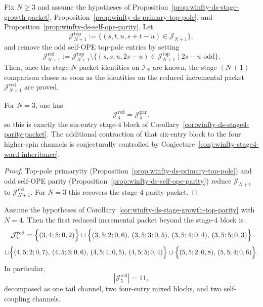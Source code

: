 \begin{corollary}
\label{cor:winfty-ds-stage-growth-top-parity}
Fix $N \ge 3$ and assume the hypotheses of
Proposition~\ref{prop:winfty-ds-stage-growth-packet},
Proposition~\ref{prop:winfty-ds-primary-top-pole}, and
Proposition~\ref{prop:winfty-ds-self-ope-parity}.  Let
\[
\mathcal{J}_{N+1}^{\mathrm{top}}
:=
\{(s,t,u,s+t-u)\in \mathcal{J}_{N+1}\},
\]
and remove the odd self-OPE top-pole entries by setting
\[
\mathcal{J}_{N+1}^{\mathrm{red}}
:=
\mathcal{J}_{N+1}^{\mathrm{top}}
\setminus
\bigl\{(s,s,u,2s-u)\in\mathcal{J}_{N+1}^{\mathrm{top}}
\mid 2s-u \text{ odd}\bigr\}.
\]
Then, once the stage-$N$ packet identities on $\mathcal{I}_N$ are
known, the stage-$(N+1)$ comparison closes as soon as the identities on
the reduced incremental packet
$\mathcal{J}_{N+1}^{\mathrm{red}}$ are proved.

For $N=3$, one has
\[
\mathcal{J}_4^{\mathrm{red}}
=
\mathcal{J}_4^{\mathrm{par}},
\]
so this is exactly the six-entry stage-$4$ block of
Corollary~\ref{cor:winfty-ds-stage4-parity-packet}.  The additional
contraction of that six-entry block to the four higher-spin channels is
conjecturally controlled by
Conjecture~\ref{conj:winfty-stage4-ward-inheritance}.
\end{corollary}

\begin{proof}
Top-pole primaryity (Proposition~\ref{prop:winfty-ds-primary-top-pole}) and odd self-OPE parity (Proposition~\ref{prop:winfty-ds-self-ope-parity}) reduce $\mathcal{J}_{N+1}$ to $\mathcal{J}_{N+1}^{\mathrm{red}}$.  For $N=3$ this recovers the stage-$4$ parity packet.
\end{proof}

\begin{corollary}
\label{cor:winfty-ds-stage5-reduced-packet}
Assume the hypotheses of
Corollary~\ref{cor:winfty-ds-stage-growth-top-parity} with $N=4$.
Then the first reduced incremental packet beyond the stage-$4$ block is
\[
\mathcal{J}_5^{\mathrm{red}}
=
\Bigl\{
(3,4;5;0,2)
\Bigr\}
\sqcup
\Bigl\{
(3,5;2;0,6),\,
(3,5;3;0,5),\,
(3,5;4;0,4),\,
(3,5;5;0,3)
\Bigr\}
\]
\[
\sqcup
\Bigl\{
(4,5;2;0,7),\,
(4,5;3;0,6),\,
(4,5;4;0,5),\,
(4,5;5;0,4)
\Bigr\}
\sqcup
\Bigl\{
(5,5;2;0,8),\,
(5,5;4;0,6)
\Bigr\}.
\]
In particular,
\[
|\mathcal{J}_5^{\mathrm{red}}|=11,
\]
decomposed as one tail channel, two four-entry mixed blocks, and two
self-coupling channels.
\end{corollary}

